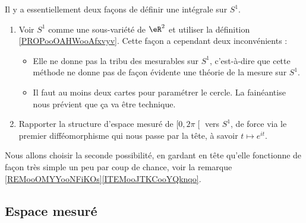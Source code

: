 Il y a essentiellement deux façons de définir une intégrale sur \( S^1\).
\begin{enumerate}
    \item Voir \( S^1\) comme une sous-variété de \( \eR^2\) et utiliser la définition \ref{PROPooOAHWooAfxvyv}. Cette façon a cependant deux inconvénients :
        \begin{itemize}
            \item Elle ne donne pas la tribu des mesurables sur \( S^1\), c'est-à-dire que cette méthode ne donne pas de façon évidente une théorie de la mesure sur \( S^1\).
            \item Il faut au moins deux cartes pour paramétrer le cercle. La fainéantise nous prévient que ça va être technique.
        \end{itemize}
    \item
        Rapporter la structure d'espace mesuré de \( \mathopen[ 0 , 2\pi \mathclose[\) vers \( S^1\), de force via le premier difféomorphisme qui nous passe par la tête, à savoir \( t\mapsto  e^{it}\).
\end{enumerate}
Nous allons choisir la seconde possibilité, en gardant en tête qu'elle fonctionne de façon très simple un peu par coup de chance, voir la remarque \ref{REMooOMYYooNFiKOs}\ref{ITEMooJTKCooYQknqo}.

\subsection{Espace mesuré}

